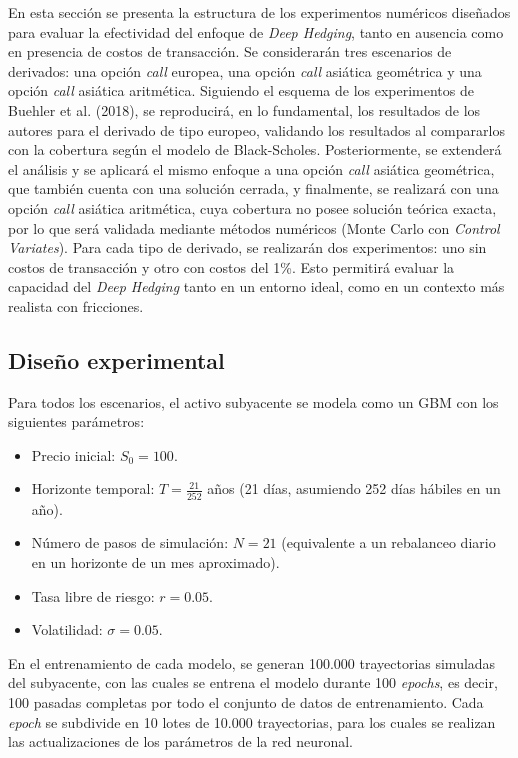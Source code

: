 \documentclass[11pt,a4paper,spanish]{article}
\numberwithin{equation}{section} %
\begin{document}
En esta sección se presenta la estructura de los experimentos numéricos diseñados para evaluar la efectividad del enfoque de \textit{Deep Hedging}, tanto en ausencia como en presencia de costos de transacción. Se considerarán tres escenarios de derivados: una opción \textit{call} europea, una opción \textit{call} asiática geométrica y una opción \textit{call} asiática aritmética. Siguiendo el esquema de los experimentos de Buehler et al. (2018), se reproducirá, en lo fundamental, los resultados de los autores para el derivado de tipo europeo, validando los resultados al compararlos con la cobertura según el modelo de Black-Scholes. Posteriormente, se extenderá el análisis y se aplicará el mismo enfoque a una opción \textit{call} asiática geométrica, que también cuenta con una solución cerrada, y finalmente, se realizará con una opción \textit{call} asiática aritmética, cuya cobertura no posee solución teórica exacta, por lo que será validada mediante métodos numéricos (Monte Carlo con \textit{Control Variates}).
Para cada tipo de derivado, se realizarán dos experimentos: uno sin costos de transacción y otro con costos del 1\%. Esto permitirá evaluar la capacidad del \textit{Deep Hedging} tanto en un entorno ideal, como en un contexto más realista con fricciones.

\subsection{Diseño experimental}

Para todos los escenarios, el activo subyacente se modela como un GBM con los siguientes parámetros:

\begin{itemize}
    \item Precio inicial: \( S_0 = 100 \).
    \item Horizonte temporal: \( T = \tfrac{21}{252} \) años (21 días, asumiendo 252 días hábiles en un año).
    \item Número de pasos de simulación: \( N = 21 \) (equivalente a un rebalanceo diario en un horizonte de un mes aproximado).
    \item Tasa libre de riesgo: \( r = 0.05 \).
    \item Volatilidad: \( \sigma = 0.05 \).
\end{itemize}


En el entrenamiento de cada modelo, se generan 100.000 trayectorias simuladas del subyacente, con las cuales se entrena el modelo durante 100 \textit{epochs}, es decir, 100 pasadas completas por todo el conjunto de datos de entrenamiento. Cada \textit{epoch} se subdivide en 10 lotes de 10.000 trayectorias, para los cuales se realizan las actualizaciones de los parámetros de la red neuronal. 
\end{document}
